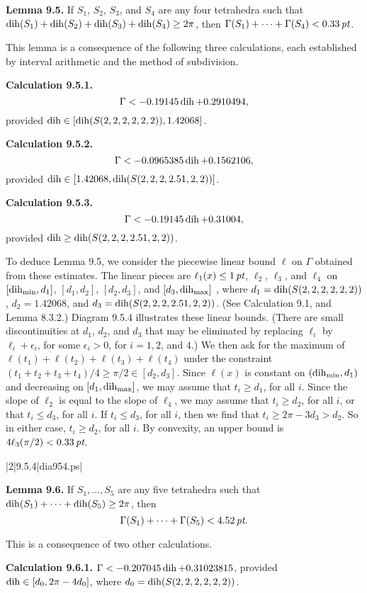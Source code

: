 \smallskip
{\bf Lemma 9.5.}  If $S_1$, $S_2$, $S_3$, and $S_4$ are any four
tetrahedra such that $\operatorname{dih}(S_1) + \operatorname{dih}(S_2) + \operatorname{dih}(S_3) +\operatorname{dih}(S_4) \ge 2\pi$,
then $\Gamma(S_1)+\cdots+\Gamma(S_4) < 0.33\,\hbox{\it pt}$.

\smallskip
This lemma is a consequence
of the following three calculations, each established by interval arithmetic
and the method of subdivision.

\smallskip
{\bf Calculation 9.5.1.}  $$\Gamma < -0.19145\operatorname{dih}+ 0.2910494,$$
        provided $\operatorname{dih}\in [\operatorname{dih}(S(2,2,2,2,2,2)),1.42068]$.

\smallskip
{\bf Calculation 9.5.2.}  $$\Gamma < -0.0965385\operatorname{dih}+ 0.1562106,$$
        provided $\operatorname{dih}\in [1.42068,\operatorname{dih}(S(2,2,2,2.51,2,2))]$.

\smallskip
{\bf Calculation 9.5.3.}  $$\Gamma < -0.19145\operatorname{dih}+ 0.31004,$$
        provided $\operatorname{dih}\ge \operatorname{dih}(S(2,2,2,2.51,2,2))$.

To deduce Lemma 9.5, we consider the piecewise linear bound $\ell$ on
$\Gamma$ obtained from these estimates.  The linear
pieces are $\ell_1(x)\le 1\,\hbox{\it pt}$,
$\ell_2$, $\ell_3$, and
$\ell_4$ on $[\operatorname{dih}_{\min},d_1]$, $[d_1,d_2]$, $[d_2,d_3]$, 
and $[d_3,\operatorname{dih}_{\max}]$ , where $d_1= \operatorname{dih}(S(2,2,2,2,2,2))$,
$d_2=1.42068$, and
$d_3 = \operatorname{dih}(S(2,2,2,2.51,2,2))$.
(See Calculation 9.1, and Lemma 8.3.2.)
Diagram 9.5.4 illustrates these linear bounds.  (There are small
discontinuities at $d_1$, $d_2$, and $d_3$ that may be eliminated by
replacing $\ell_i$ by $\ell_i+\epsilon_i$, for some $\epsilon_i>0$, for
$i=1,2$, and $4$.)
 We then ask for the maximum of
$\ell(t_1) + \ell(t_2) + \ell(t_3) + \ell(t_4)$ under the constraint
$(t_1+t_2+t_3+t_4)/4\ge \pi/2 \in [d_2,d_3]$.
Since $\ell(x)$ is constant on $(\operatorname{dih}_{\min},d_1)$ and decreasing on
$[d_1,\operatorname{dih}_{\max}]$, we may assume
that $t_i\ge d_1$, for all  $i$.  Since the slope of $\ell_2$ is
equal to the slope of $\ell_4$, we may assume that $t_i \ge d_2$,
for all $i$, or that $t_i\le d_3$, for all $i$.
If $t_i\le d_3$, for all $i$, then we find that $t_i\ge 2\pi-3 d_3 > d_2$.
So in either case, $t_i\ge d_2$, for all $i$.
By convexity, an upper bound is
$4\ell_3(\pi/2)< 0.33\,\hbox{\it pt}$.

\gram|2|9.5.4|dia954.ps|  

\bigskip
{\bf Lemma 9.6.}  If $S_1,\ldots, S_5$ are any five tetrahedra
such that $\operatorname{dih}(S_1)+\cdots+\operatorname{dih}(S_5) \ge 2\pi$, then
$$\Gamma(S_1)+\cdots+\Gamma(S_5) < 4.52\,\hbox{\it pt}.$$

\smallskip
This is a consequence of two other calculations.

\smallskip
{\bf Calculation 9.6.1.}  $\Gamma< -0.207045\operatorname{dih} + 0.31023815$,
        provided $\operatorname{dih}\in [d_0,2\pi-4d_0]$, where
        $d_0 =\operatorname{dih}(S(2,2,2,2,2,2))$.

